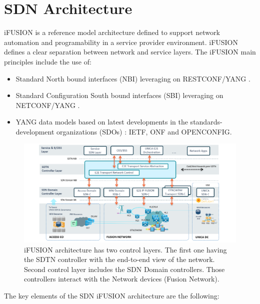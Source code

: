 \documentclass[a4paper,fleqn]{cas-dc}
\begin{document}
\section{SDN Architecture}
\label{section:arq}

i\uppercase{FUSION} is a reference model architecture defined to support network automation and programability in a service provider environment. i\uppercase{FUSION} defines a clear separation between network and service layers.  The i\uppercase{FUSION} main principles include the use of:
\begin{itemize}
    \item Standard North bound interfaces (NBI) leveraging on \uppercase{RESTconf/YANG} \cite{bierman2017restconf}.
    \item Standard Configuration South bound interfaces (SBI) leveraging on \uppercase{NETCONF/YANG} \cite{enns2011network}.
    \item YANG data models based on latest developments in the standards-development organizations (SDOs) \cite{bjorklund2016yang}: \uppercase{IETF}, \uppercase{ONF} and \uppercase{OpenConfig}.
\end{itemize}

\begin{figure}
	\centering
		\includegraphics[width=\linewidth]{figs/ifusion_architecture.png}
	\caption{i\uppercase{FUSION} architecture has two control layers. The first one having the SDTN controller with the end-to-end view of the network. Second control layer includes the SDN Domain controllers. Those controllers interact with the Network devices (Fusion Network).}
	\label{FIG:1}
\end{figure}

The key elements of the SDN i\uppercase{FUSION} architecture are the following:
\end{document}
